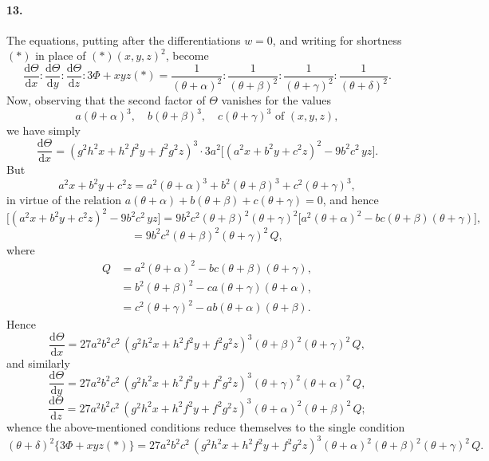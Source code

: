 \documentclass[11pt,a4paper]{article}
\providecommand{\dd}{\mathrm{d}}
\begin{document}
\paragraph{13.}
The equations, putting after the differentiations $w = 0$, and writing for shortness
$(*)$ in place of $(*)(x, y, z)^2$, become
\[
\frac{\dd \Theta}{\dd x} : \frac{\dd \Theta}{\dd y} : \frac{\dd \Theta}{\dd z}
 : 3 \Phi + xyz (*) = \frac{1}{(\theta + \alpha)^2} : \frac{1}{(\theta + \beta)^2}
 : \frac{1}{(\theta + \gamma)^2} : \frac{1}{(\theta + \delta)^2}.
\]
Now, observing that the second factor of $\Theta$ vanishes for the values
\[
a(\theta + \alpha)^3,\quad b(\theta + \beta)^3,\quad c(\theta + \gamma)^3
 \text{ of } (x, y, z),
\]
we have simply
\[
\frac{\dd \Theta}{\dd x} = (g^2 h^2 x + h^2 f^2 y + f^2 g^2 z)^3 \cdot 3 a^2
 \bigl[(a^2 x + b^2 y + c^2 z)^2 - 9 b^2 c^2 \, yz \bigr].
\]
But
\[
a^2 x + b^2 y + c^2 z = a^2(\theta + \alpha)^3 + b^2(\theta + \beta)^3 + c^2(\theta + \gamma)^3,
\]
in virtue of the relation $a(\theta + \alpha) + b(\theta + \beta) + c(\theta + \gamma) = 0$,
and hence
\[
\bigl[(a^2 x + b^2 y + c^2 z)^2 - 9 b^2 c^2 \, yz \bigr]
 = 9 b^2 c^2 (\theta + \beta)^2 (\theta + \gamma)^2
   \bigl[ a^2 (\theta + \alpha)^2 - bc(\theta + \beta)(\theta + \gamma) \bigr],
\]
\[
= 9 b^2 c^2 (\theta + \beta)^2 (\theta + \gamma)^2 \, Q,
\]
where
\[
\begin{aligned}
Q &= a^2(\theta + \alpha)^2 - bc(\theta + \beta)(\theta + \gamma), \\
  &= b^2(\theta + \beta)^2 - ca(\theta + \gamma)(\theta + \alpha), \\
  &= c^2(\theta + \gamma)^2 - ab(\theta + \alpha)(\theta + \beta).
\end{aligned}
\]
Hence
\[
\frac{\dd \Theta}{\dd x} = 27 a^2 b^2 c^2 \, (g^2 h^2 x + h^2 f^2 y + f^2 g^2 z)^3
 (\theta + \beta)^2 (\theta + \gamma)^2 \, Q,
\]
and similarly
\[
\frac{\dd \Theta}{\dd y} = 27 a^2 b^2 c^2 \, (g^2 h^2 x + h^2 f^2 y + f^2 g^2 z)^3
 (\theta + \gamma)^2 (\theta + \alpha)^2 \, Q,
\]
\[
\frac{\dd \Theta}{\dd z} = 27 a^2 b^2 c^2 \, (g^2 h^2 x + h^2 f^2 y + f^2 g^2 z)^3
 (\theta + \alpha)^2 (\theta + \beta)^2 \, Q;
\]
whence the above-mentioned conditions reduce themselves to the single condition
\[
(\theta + \delta)^2 \bigl\{ 3 \Phi + xyz (*) \bigr\}
 = 27 a^2 b^2 c^2 \, (g^2 h^2 x + h^2 f^2 y + f^2 g^2 z)^3
   (\theta + \alpha)^2 (\theta + \beta)^2 (\theta + \gamma)^2 \, Q.
\]
\end{document}
